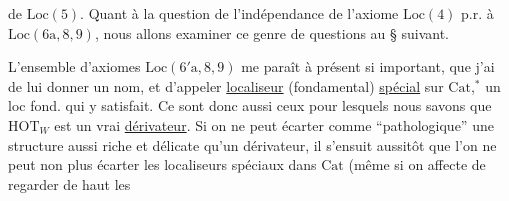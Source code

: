 de $\mathrm{Loc}(5)$. Quant à la question de l'indépendance
de l'axiome $\mathrm{Loc}(4)$ p.r.
à $\mathrm{Loc}(6\mathrm{a},8,9)$, nous allons examiner
ce genre de questions au \S{} suivant.

L'ensemble d'axiomes $\mathrm{Loc}(6'\mathrm{a},8,9)$ me
paraît à présent si important, que j'ai
 de lui donner un nom, et
d'appeler \uline{localiseur} (fondamental) \uline{spécial}
sur $\mathrm{Cat}$,$^{\ast}$ un loc fond. qui y satisfait.
Ce sont donc aussi ceux pour lesquels
nous savons que $\mathrm{HOT}_{W}$ est un
vrai \uline{dérivateur}. Si on ne peut
écarter comme ``pathologique'' une
structure aussi riche et délicate qu'un
dérivateur, il s'ensuit aussitôt que
l'on ne peut non plus écarter  les
localiseurs spéciaux dans $\mathrm{Cat}$ (même
si on affecte de regarder de haut les
